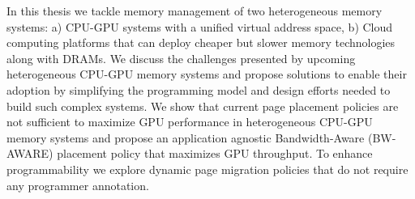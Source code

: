 In this thesis we tackle memory management of two heterogeneous memory systems:
a) CPU-GPU systems with a unified virtual address space, b) Cloud computing
platforms that can deploy cheaper but slower memory technologies along with
DRAMs.  We discuss the challenges presented by upcoming heterogeneous CPU-GPU
memory systems and propose solutions to enable their adoption by simplifying the
programming model and design efforts needed to build such complex systems.  We
show that current page placement policies are not sufficient to maximize GPU
performance in heterogeneous CPU-GPU memory systems and propose an application
agnostic Bandwidth-Aware (BW-AWARE) placement policy that maximizes GPU
throughput.
%
To enhance programmability we explore dynamic page migration policies that do
not require any programmer annotation.
